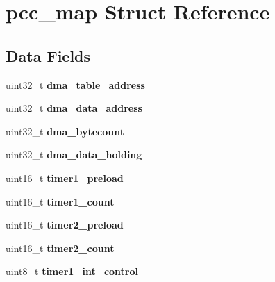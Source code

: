 \hypertarget{structpcc__map}{}\section{pcc\+\_\+map Struct Reference}
\label{structpcc__map}
\subsection*{Data Fields}
\begin{DoxyCompactItemize}
\item 
\mbox{\label{structpcc__map_a7416bfd07cd90b0f58152073af010a11}} 
uint32\+\_\+t {\bfseries dma\+\_\+table\+\_\+address}
\item 
\mbox{\label{structpcc__map_a48cb84d29d5b448021e78d000e7564d1}} 
uint32\+\_\+t {\bfseries dma\+\_\+data\+\_\+address}
\item 
\mbox{\label{structpcc__map_a0875df64b6d861760fbab41bfc3c62be}} 
uint32\+\_\+t {\bfseries dma\+\_\+bytecount}
\item 
\mbox{\label{structpcc__map_aa019b5997923fec563fde23632e4eee8}} 
uint32\+\_\+t {\bfseries dma\+\_\+data\+\_\+holding}
\item 
\mbox{\label{structpcc__map_aa7904de36d3071cbdd36b2658a5ac279}} 
uint16\+\_\+t {\bfseries timer1\+\_\+preload}
\item 
\mbox{\label{structpcc__map_a749fefee9bc5a83ed7f5993cf379c9ae}} 
uint16\+\_\+t {\bfseries timer1\+\_\+count}
\item 
\mbox{\label{structpcc__map_aa26c60a5082867c82cdcb3a2775a2a25}} 
uint16\+\_\+t {\bfseries timer2\+\_\+preload}
\item 
\mbox{\label{structpcc__map_a927e3b5a71c1ec2135782c9709fdc37b}} 
uint16\+\_\+t {\bfseries timer2\+\_\+count}
\item 
\mbox{\label{structpcc__map_a03bda8e1796a90e4fc24674a487e191b}} 
uint8\+\_\+t {\bfseries timer1\+\_\+int\+\_\+control}
\item 
\mbox{\label{structpcc__map_a14fd54c08806d2b6ea28b3d5e5ecfe2b}} 

\end{DoxyCompactItemize}
